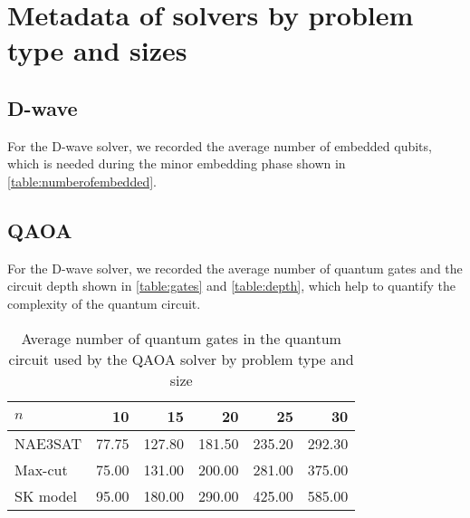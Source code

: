 \chapter{Metadata of solvers by problem type and sizes}\label{appendix:metadata}

\section{D-wave}
For the D-wave solver, we recorded the average number of embedded qubits, which is needed during the minor embedding phase shown in \autoref{table:numberofembedded}.

\begin{table}[!ht]
    \centering
    \caption{Average number of embedded qubits for the D-wave solver by problem type and size}
    \label{table:numberofembedded}
\end{table}

\section{QAOA}
For the D-wave solver, we recorded the average number of quantum gates and the circuit depth shown in \autoref{table:gates} and \autoref{table:depth}, which help to quantify the complexity of the quantum circuit.

\begin{table}[!ht]
    \centering
    \begin{tabular}{lrrrrr} \toprule
        $n$ & 10 & 15 & 20 & 25 & 30\\ \midrule
        NAE3SAT & 77.75 & 127.80 & 181.50 & 235.20 & 292.30 \\
        Max-cut & 75.00 & 131.00 & 200.00 & 281.00 & 375.00 \\
        SK model & 95.00 & 180.00 & 290.00 & 425.00 & 585.00\\ \bottomrule
    \end{tabular}
    \caption{Average number of quantum gates in the quantum circuit used by the QAOA solver by problem type and size}
    \label{table:gates}
\end{table}

